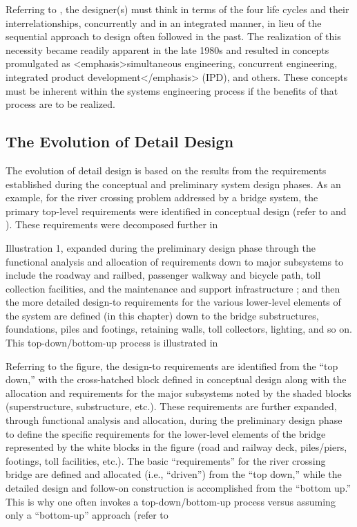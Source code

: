 Referring to , the designer(s) must think in terms of the four life cycles and their interrelationships, concurrently and in an integrated manner, in lieu of the sequential approach to design often followed in the past. The realization of this necessity became readily apparent in the late 1980s and resulted in concepts promulgated as <emphasis>simultaneous engineering, concurrent engineering, integrated product development</emphasis> (IPD), and others. These concepts must be inherent within the systems engineering process if the benefits of that process are to be realized.

\subsection{The Evolution of Detail Design}

The evolution of detail design is based on the results from the requirements established during the conceptual and preliminary system design phases. As an example, for the river crossing problem addressed by a bridge system, the primary top-level requirements were identified in conceptual design (refer to  and ). These requirements were decomposed further in 

Illustration 1, expanded during the preliminary design phase through the functional analysis and allocation of requirements down to major subsystems to include the roadway and railbed, passenger walkway and bicycle path, toll collection facilities, and the maintenance and support infrastructure ; and then the more detailed design-to requirements for the various lower-level elements of the system are defined (in this chapter) down to the bridge substructures, foundations, piles and footings, retaining walls, toll collectors, lighting, and so on. This top-down/bottom-up process is illustrated in 

Referring to the figure, the design-to requirements are identified from the ``top down,'' with the cross-hatched block defined in conceptual design along with the allocation and requirements for the major subsystems noted by the shaded blocks (superstructure, substructure, etc.). These requirements are further expanded, through functional analysis and allocation, during the preliminary design phase to define the specific requirements for the lower-level elements of the bridge represented by the white blocks in the figure (road and railway deck, piles/piers, footings, toll facilities, etc.). The basic ``requirements'' for the river crossing bridge are defined and allocated (i.e., ``driven'') from the ``top down,'' while the detailed design and follow-on construction is accomplished from the ``bottom up.'' This is why one often invokes a top-down/bottom-up process versus assuming only a ``bottom-up'' approach (refer to 

